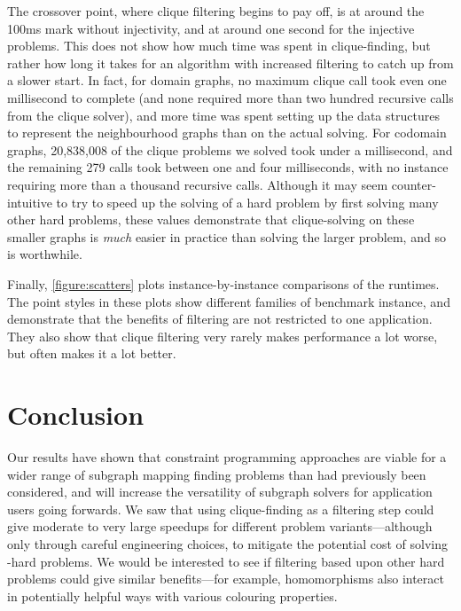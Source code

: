 \documentclass{article}
\begin{document}
The crossover point, where clique filtering begins to pay off, is at around the 100ms mark without
injectivity, and at around one second for the injective problems. This does not show how much time
was spent in clique-finding, but rather how long it takes for an algorithm with increased
filtering to catch up from a slower start. In fact, for domain graphs, no maximum clique call took
even one millisecond to complete (and none required more than two hundred recursive calls from the
clique solver), and more time was spent setting up the data structures to represent the
neighbourhood graphs than on the actual solving. For codomain graphs, 20,838,008 of the clique
problems we solved took under a millisecond, and the remaining 279 calls took between one and four
milliseconds, with no instance requiring more than a thousand recursive calls.  Although it may seem
counter-intuitive to try to speed up the solving of a hard problem by first solving many other hard
problems, these values demonstrate that clique-solving on these smaller graphs is \emph{much} easier
in practice than solving the larger problem, and so is worthwhile.

Finally, \cref{figure:scatters} plots instance-by-instance comparisons of the runtimes. The
point styles in these plots show different families of benchmark instance, and demonstrate
that the benefits of filtering are not restricted to one application. They also show that clique
filtering very rarely makes performance a lot worse, but often makes it a lot better.

\section{Conclusion}

Our results have shown that constraint programming approaches are viable for a wider range of subgraph
mapping finding problems than had previously been considered, and will increase the versatility of
subgraph solvers for application users going forwards. We saw that using clique-finding as a
filtering step could give moderate to very large speedups for different problem variants---although
only through careful engineering choices, to mitigate the potential cost of solving \NP-hard
problems. We would be interested to see if filtering based upon other hard problems could give
similar benefits---for example, homomorphisms also interact in potentially helpful ways with various
colouring properties.

% 



\end{document}
